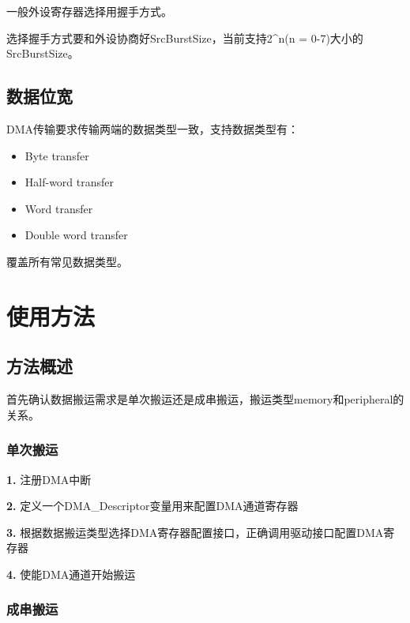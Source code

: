 \documentclass[
  12pt,
]{book}
\begin{document}
一般外设寄存器选择用握手方式。

选择握手方式要和外设协商好SrcBurstSize，当前支持2\^{}n(n = 0-7)大小的SrcBurstSize。

\hypertarget{ux6570ux636eux4f4dux5bbd}{%
\subsection{数据位宽}\label{ux6570ux636eux4f4dux5bbd}}

DMA传输要求传输两端的数据类型一致，支持数据类型有：

\begin{itemize}
\item
  Byte transfer
\item
  Half-word transfer
\item
  Word transfer
\item
  Double word transfer
\end{itemize}

覆盖所有常见数据类型。

\hypertarget{ux4f7fux7528ux65b9ux6cd5-1}{%
\section{使用方法}\label{ux4f7fux7528ux65b9ux6cd5-1}}

\hypertarget{ux65b9ux6cd5ux6982ux8ff0-1}{%
\subsection{方法概述}\label{ux65b9ux6cd5ux6982ux8ff0-1}}

首先确认数据搬运需求是单次搬运还是成串搬运，搬运类型memory和peripheral的关系。

\hypertarget{ux5355ux6b21ux642cux8fd0}{%
\subsubsection{单次搬运}\label{ux5355ux6b21ux642cux8fd0}}

\textbf{1.} 注册DMA中断

\textbf{2.} 定义一个DMA\_Descriptor变量用来配置DMA通道寄存器

\textbf{3.} 根据数据搬运类型选择DMA寄存器配置接口，正确调用驱动接口配置DMA寄存器

\textbf{4.} 使能DMA通道开始搬运

\hypertarget{ux6210ux4e32ux642cux8fd0}{%
\subsubsection{成串搬运}\label{ux6210ux4e32ux642cux8fd0}}
\end{document}
